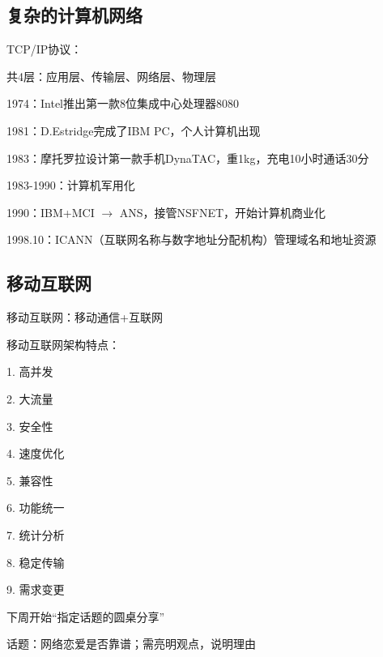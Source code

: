 \subsection{复杂的计算机网络}%
\label{sub:复杂的计算机网络}
\begin{notation}
    TCP/IP协议：

    共4层：应用层、传输层、网络层、物理层
\end{notation}
1974：Intel推出第一款8位集成中心处理器8080

1981：D.Estridge完成了IBM PC，个人计算机出现

1983：摩托罗拉设计第一款手机DynaTAC，重1kg，充电10小时通话30分

1983-1990：计算机军用化

1990：IBM+MCI $\to $ ANS，接管NSFNET，开始计算机商业化

1998.10：ICANN（互联网名称与数字地址分配机构）管理域名和地址资源
\subsection{移动互联网}%
\label{sub:移动互联网}
\begin{defi}
    移动互联网：移动通信+互联网
\end{defi}
移动互联网架构特点：

1. 高并发

2. 大流量

3. 安全性

4. 速度优化

5. 兼容性

6. 功能统一

7. 统计分析

8. 稳定传输

9. 需求变更
\begin{notation}
    下周开始“指定话题的圆桌分享”

    话题：网络恋爱是否靠谱；需亮明观点，说明理由
\end{notation}

